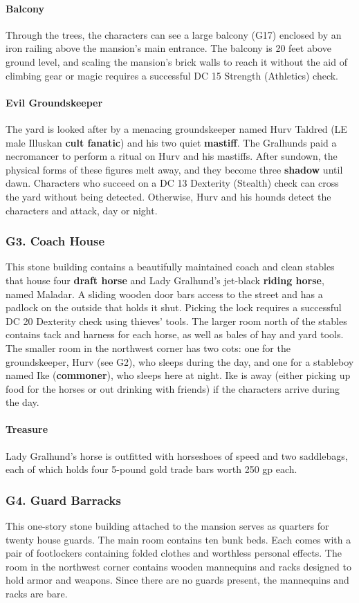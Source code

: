 \documentclass[10pt,a4paper,twoside,twocolumn,openany,nodeprecatedcode]{dndbook}
\begin{document}
\paragraph{Balcony}
Through the trees, the characters can see a large balcony (G17) enclosed by an iron railing above the mansion's main entrance. The balcony is 20 feet above ground level, and scaling the mansion's brick walls to reach it without the aid of climbing gear or magic requires a successful DC 15 Strength (Athletics) check.
\paragraph{Evil Groundskeeper}
The yard is looked after by a menacing groundskeeper named Hurv Taldred (LE male Illuskan \textbf{cult fanatic}) and his two quiet \textbf{mastiff}. The Gralhunds paid a necromancer to perform a ritual on Hurv and his mastiffs. After sundown, the physical forms of these figures melt away, and they become three \textbf{shadow} until dawn. Characters who succeed on a DC 13 Dexterity (Stealth) check can cross the yard without being detected. Otherwise, Hurv and his hounds detect the characters and attack, day or night.
\subsubsection{G3. Coach House}
This stone building contains a beautifully maintained coach and clean stables that house four \textbf{draft horse} and Lady Gralhund's jet-black \textbf{riding horse}, named Maladar. A sliding wooden door bars access to the street and has a padlock on the outside that holds it shut. Picking the lock requires a successful DC 20 Dexterity check using thieves' tools.
The larger room north of the stables contains tack and harness for each horse, as well as bales of hay and yard tools. The smaller room in the northwest corner has two cots: one for the groundskeeper, Hurv (see G2), who sleeps during the day, and one for a stableboy named Ike (\textbf{commoner}), who sleeps here at night. Ike is away (either picking up food for the horses or out drinking with friends) if the characters arrive during the day.
\paragraph{Treasure}
Lady Gralhund's horse is outfitted with horseshoes of speed and two saddlebags, each of which holds four 5-pound gold trade bars worth 250 gp each.
\subsubsection{G4. Guard Barracks}
This one-story stone building attached to the mansion serves as quarters for twenty house guards. The main room contains ten bunk beds. Each comes with a pair of footlockers containing folded clothes and worthless personal effects.
The room in the northwest corner contains wooden mannequins and racks designed to hold armor and weapons. Since there are no guards present, the mannequins and racks are bare.
\end{document}
